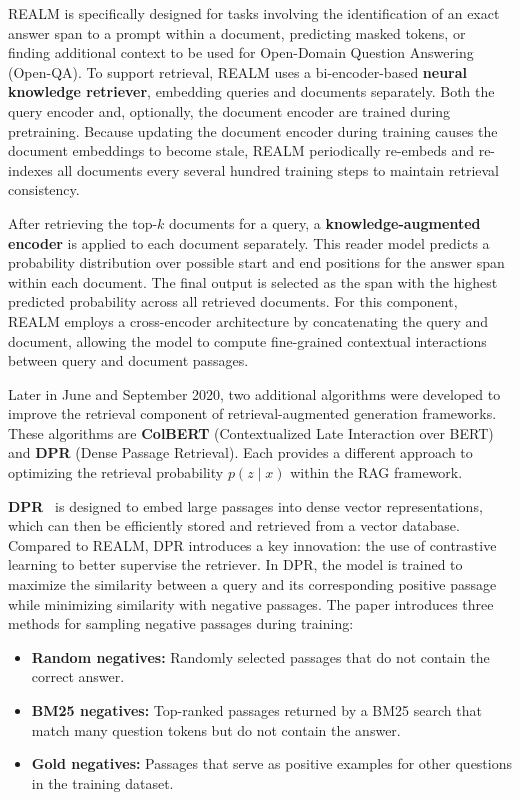 \documentclass[twocolumn, 10pt]{article}
\begin{document}
REALM is specifically designed for tasks involving the identification of an exact answer span to a prompt within a document, predicting masked tokens, or finding additional context to be used for Open-Domain Question Answering (Open-QA). To support retrieval, REALM uses a bi-encoder-based \textbf{neural knowledge retriever}, embedding queries and documents separately. Both the query encoder and, optionally, the document encoder are trained during pretraining. Because updating the document encoder during training causes the document embeddings to become stale, REALM periodically re-embeds and re-indexes all documents every several hundred training steps to maintain retrieval consistency.

After retrieving the top-\(k\) documents for a query, a \textbf{knowledge-augmented encoder} is applied to each document separately. This reader model predicts a probability distribution over possible start and end positions for the answer span within each document. The final output is selected as the span with the highest predicted probability across all retrieved documents. For this component, REALM employs a cross-encoder architecture by concatenating the query and document, allowing the model to compute fine-grained contextual interactions between query and document passages.


Later in June and September 2020, two additional algorithms were developed to improve the retrieval component of retrieval-augmented generation frameworks. These algorithms are \textbf{ColBERT} (Contextualized Late Interaction over BERT) and \textbf{DPR} (Dense Passage Retrieval). Each provides a different approach to optimizing the retrieval probability \( p(z \mid x) \) within the RAG framework.

\textbf{DPR}~\cite{karpukhin2020dense} is designed to embed large passages into dense vector representations, which can then be efficiently stored and retrieved from a vector database. Compared to REALM, DPR introduces a key innovation: the use of contrastive learning to better supervise the retriever. In DPR, the model is trained to maximize the similarity between a query and its corresponding positive passage while minimizing similarity with negative passages. The paper introduces three methods for sampling negative passages during training:

\begin{itemize}
    \item \textbf{Random negatives:} Randomly selected passages that do not contain the correct answer.
    \item \textbf{BM25 negatives:} Top-ranked passages returned by a BM25 search that match many question tokens but do not contain the answer.
    \item \textbf{Gold negatives:} Passages that serve as positive examples for other questions in the training dataset.
\end{itemize}
\end{document}
